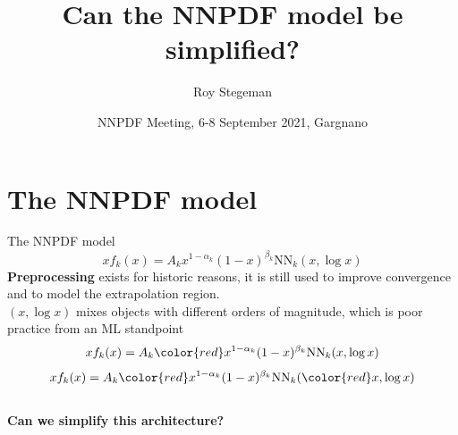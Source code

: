 \documentclass[aspectratio=169,11pt]{beamer}
\title{Can the NNPDF model be simplified?}
\date{NNPDF Meeting, 6-8 September 2021, Gargnano}
\author{Roy Stegeman}
\institute{University of Milan and INFN Milan}
\newcommand{\nn}{\vspace*{1em}}
\begin{document}
{
\begin{frame}
  \titlepage
\end{frame}
}


\section*{The NNPDF model}



\begin{frame}[t]{The NNPDF model}
   {$$ xf_k(x) = A_k x^{1-\alpha_k}(1-x)^{\beta_k} \mathrm{NN}_k(x,\log x) $$}
   {{\bf Preprocessing} exists for historic reasons, it is still used to improve convergence and to model the extrapolation region. \\ \nn}
   {$(x,\log x)$ mixes objects with different orders of magnitude, which is poor practice from an ML standpoint \\ \nn}
   {$$ xf_k(x) = A_k {\color{red} x^{1-\alpha_k}(1-x)^{\beta_k}} \mathrm{NN}_k(x,\log x) $$}
   {$$ xf_k(x) = A_k {\color{red} x^{1-\alpha_k}(1-x)^{\beta_k}} \mathrm{NN}_k({\color{red} x,\log x}) $$}
   {\\ \vspace*{1.5cm} \bf \centering Can we simplify this architecture?}
\end{frame}
\end{document}
